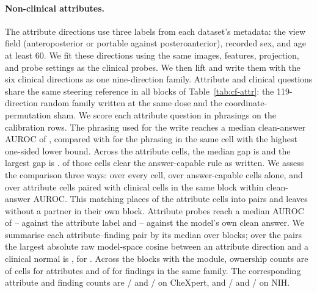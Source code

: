 \paragraph{Non-clinical attributes.} The attribute directions use three labels from each dataset's metadata: the view field (anteroposterior or portable against posteroanterior), recorded sex, and age at least 60. We fit these directions using the same images, features, projection, and probe settings as the clinical probes. We then lift and write them with the six clinical directions as one nine-direction family. Attribute and clinical questions share the same steering reference in all \cfAttrRefBlocks{} blocks of Table~\ref{tab:cf-attr}: the 119-direction random family written at the same dose and the coordinate-permutation sham. We score each attribute question in \cfAttrqPhrasings{} phrasings on the calibration rows. The phrasing used for the write reaches a median clean-answer AUROC of \cfAttrqWrittenAuroc{}, compared with \cfAttrqSelectedAuroc{} for the phrasing in the same cell with the highest one-sided lower bound. Across the \cfAttrqCells{} attribute cells, the median gap is \cfAttrqGain{} and the largest gap is \cfAttrqGainMax{}. \cfAttrqCapable{} of those cells clear the answer-capable rule as written. We assess the comparison three ways: over every cell, over answer-capable cells alone, and over attribute cells paired with clinical cells in the same block within \cfAttrPairWindow{} clean-answer AUROC. This matching places \cfAttrPairMatched{} of the \cfAttrPairCellsN{} attribute cells into \cfAttrPairAttrN{} pairs and leaves \cfAttrPairUnmatched{} without a partner in their own block. Attribute probes reach a median AUROC of \cfAttrAurocMin{}--\cfAttrAurocMax{} against the attribute label and \cfAttrAnswerAurocMin{}--\cfAttrAnswerAurocMax{} against the model's own clean answer. We summarise each attribute--finding pair by its median over blocks; over the \cfAttrCosPairs{} pairs the largest absolute raw model-space cosine between an attribute direction and a clinical normal is \cfAttrCosMax{}, for \cfAttrCosPairLabel{}. Across the \cfAttrBlocks{} blocks with the module, ownership counts are \cfAttrChestAttrOwned{} of \cfAttrChestAttrN{} cells for attributes and \cfAttrChestClinOwned{} of \cfAttrChestClinN{} for findings in the same family. The corresponding attribute and finding counts are \cfAttrChexAttrOwned{}/\cfAttrChexAttrN{} and \cfAttrChexClinOwned{}/\cfAttrChexClinN{} on CheXpert, and \cfAttrNihAttrOwned{}/\cfAttrNihAttrN{} and \cfAttrNihClinOwned{}/\cfAttrNihClinN{} on NIH.


